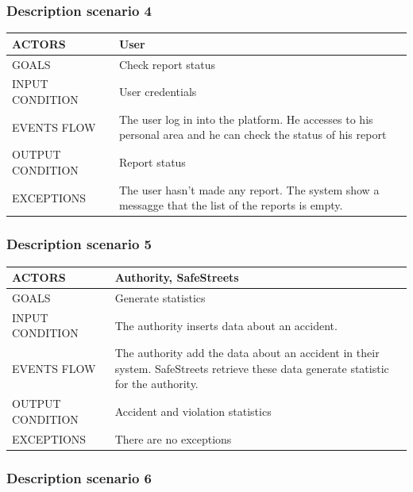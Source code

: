 \subsubsection{Description scenario 4}

\begin{center}
	\begin{tabular}{ | l | p{6cm} | } 
		\hline
		ACTORS & User  \\ 
		\hline
		GOALS & Check report status  \\ 
		\hline
		INPUT CONDITION & User credentials  \\ 
		\hline
		EVENTS FLOW & The user log in into the platform. He accesses to his personal area and he can check the status of his report \\ 
		\hline
		OUTPUT CONDITION & Report status \\ 
		\hline
		EXCEPTIONS & The user hasn't made any report. The system show a messagge that the list of the reports is empty.  \\ 
		\hline
	\end{tabular}
\end{center}

\subsubsection{Description scenario 5}

\begin{center}
	\begin{tabular}{ | l | p{6cm} | } 
		\hline
		ACTORS & Authority, SafeStreets  \\ 
		\hline
		GOALS & Generate statistics  \\ 
		\hline
		INPUT CONDITION & The authority inserts data about an accident. \\ 
		\hline
		EVENTS FLOW & The authority add the data about an accident in their system. SafeStreets retrieve these data generate statistic for the authority. \\ 
		\hline
		OUTPUT CONDITION & Accident and violation statistics\\ 
		\hline
		EXCEPTIONS & There are no exceptions  \\ 
		\hline
	\end{tabular}
\end{center}

\subsubsection{Description scenario 6}

